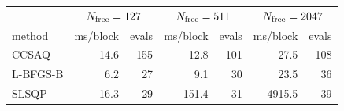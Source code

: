 \begin{tabular}{l r r r r r r}
 & \multicolumn{2}{c}{$N_{\rm free}=127$} & \multicolumn{2}{c}{$N_{\rm free}=511$} & \multicolumn{2}{c}{$N_{\rm free}=2047$} \\
method & ms/block & evals & ms/block & evals & ms/block & evals \\
\hline
CCSAQ & 14.6 & 155 & 12.8 & 101 & 27.5 & 108 \\
L-BFGS-B & 6.2 & 27 & 9.1 & 30 & 23.5 & 36 \\
SLSQP & 16.3 & 29 & 151.4 & 31 & 4915.5 & 39 \\
\end{tabular}
